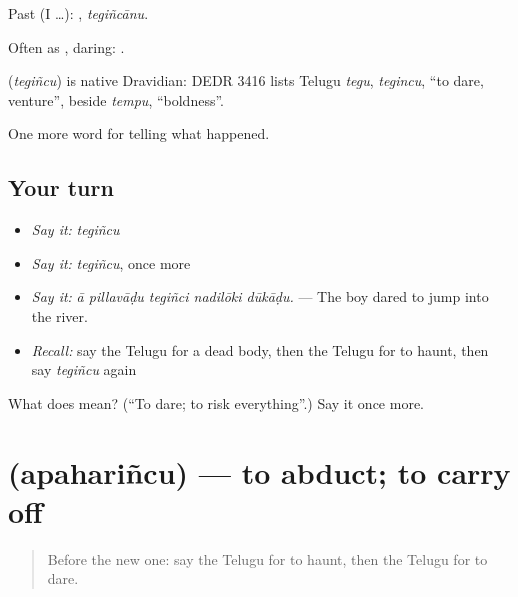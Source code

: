 Past (I …): , \emph{tegiñcānu}.

Often as , daring:   .

\begin{cousinweb}
\textbf{} (\emph{tegiñcu}) is native Dravidian: DEDR 3416 lists Telugu \emph{tegu}, \emph{tegincu}, \textquotedblleft{}to dare, venture\textquotedblright{}, beside \emph{tempu}, \textquotedblleft{}boldness\textquotedblright{}.
\end{cousinweb}

\begin{grammarlens}[title={What you've built}]
One more word for telling what happened.
\end{grammarlens}

\subsection*{Your turn}
\begin{itemize}
\raggedright
  \item \emph{Say it:} \emph{tegiñcu}
  \item \emph{Say it:} \emph{tegiñcu}, once more
  \item \emph{Say it:} \emph{ā pillavāḍu tegiñci nadilōki dūkāḍu.} — The boy dared to jump into the river.
  \item \emph{Recall:} say the Telugu for a dead body, then the Telugu for to haunt, then say \emph{tegiñcu} again
\end{itemize}

\begin{tcolorbox}[breakable,colback=teal!4,colframe=teal!35!black,title={Before you move on}]
What does  mean? (\textquotedblleft{}To dare; to risk everything\textquotedblright{}.) Say it once more.
\end{tcolorbox}
\section[\texorpdfstring{\te{అపహరించు} (apahariñcu)}{అపహరించు (apahariñcu)}]{ (apahariñcu) — to abduct; to carry off}

\label{lesson:TE-C381-apaharincu}



\begin{quote}
Before the new one: say the Telugu for to haunt, then the Telugu for to dare.
\end{quote}

